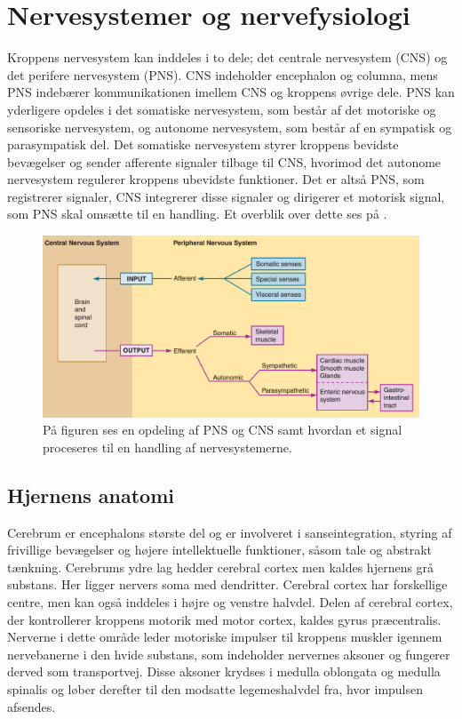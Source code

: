 \chapter{Nervesystemer og nervefysiologi}\label{AppNerve}
Kroppens nervesystem kan inddeles i to dele; det centrale nervesystem (CNS) og det perifere nervesystem (PNS). CNS indeholder encephalon og columna, mens PNS indebærer kommunikationen imellem CNS og kroppens øvrige dele. PNS kan yderligere opdeles i det somatiske nervesystem, som består af det motoriske og sensoriske nervesystem, og autonome nervesystem, som består af en sympatisk og parasympatisk del. Det somatiske nervesystem styrer kroppens bevidste bevægelser og sender afferente signaler tilbage til CNS, hvorimod det autonome nervesystem regulerer kroppens ubevidste funktioner. Det er altså PNS, som registrerer signaler, CNS integrerer disse signaler og dirigerer et motorisk signal, som PNS skal omsætte til en handling. \cite{Martini2012,Stanfield2014} Et overblik over dette ses på .

\begin{figure}[H]
	\centering
	\includegraphics[scale=0.7]{figures/bProblemanalyse/Nervesys1.png}
	\caption{På figuren ses en opdeling af PNS og CNS samt hvordan et signal proceseres til en handling af nervesystemerne. \cite{Stanfield2014}}
	\label{Nersys}
\end{figure}

\section{Hjernens anatomi}
Cerebrum er encephalons største del og er involveret i sanseintegration, styring af frivillige bevægelser og højere intellektuelle funktioner, såsom tale og abstrakt tænkning. \cite{Academic2015b} Cerebrums ydre lag hedder cerebral cortex men kaldes hjernens grå substans. Her ligger nervers soma med dendritter. Cerebral cortex har forskellige centre, men kan også inddeles i højre og venstre halvdel. Delen af cerebral cortex, der kontrollerer kroppens motorik med motor cortex, kaldes gyrus præcentralis. Nerverne i dette område leder motoriske impulser til kroppens muskler igennem nervebanerne i den hvide substans, som indeholder nervernes aksoner og fungerer derved som transportvej. \cite{Martini2012,Stanfield2014,Academic2015b} Disse aksoner krydses i medulla oblongata og medulla spinalis og løber derefter til den modsatte legemeshalvdel fra, hvor impulsen afsendes. \cite{Martini2012}

